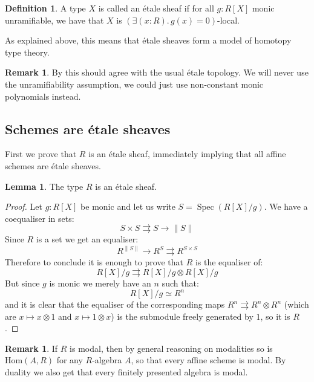 \documentclass[10pt,a4paper]{article}
\theoremstyle{definition}
\newtheorem{lemma}[theorem]{Lemma}
\newtheorem{definition}[theorem]{Definition}
\newtheorem{remark}[theorem]{Remark}
\DeclareMathOperator{\Spec}{Spec}
\newcommand{\propTrunc}[1]{\lVert #1 \rVert}
\begin{document}
\begin{definition}
A type $X$ is called an \'etale sheaf if for all $g:R[X]$ monic unramifiable, we have that $X$ is $(\exists(x:R).\, g(x)=0)$-local.
\end{definition}

As explained above, this means that étale sheaves form a model of homotopy type theory.


\begin{remark}
  By \cite{wraith79} this should agree with the usual \'etale topology.
  We will never use the unramifiability assumption, we could just use non-constant monic polynomials instead.
\end{remark}


\subsection{Schemes are \'etale sheaves}

First we prove that $R$ is an étale sheaf, immediately implying that all affine schemes are étale sheaves.

\begin{lemma}\label{etale-subcanonical}
The type $R$ is an \'etale sheaf.
\end{lemma}

\begin{proof}
Let $g:R[X]$ be monic and let us write $S=\Spec(R[X]/g)$. We have a coequaliser in sets:
\[S\times S\rightrightarrows S \to \propTrunc{S}\]
Since $R$ is a set we get an equaliser:
\[R^{\propTrunc{S}} \to R^S\rightrightarrows R^{S\times S}\]
Therefore to conclude it is enough to prove that $R$ is the equaliser of:
\[R[X]/g \rightrightarrows R[X]/g \otimes R[X]/g\]
But since $g$ is monic we merely have an $n$ such that:
\[R[X]/g \simeq R^n\]
and it is clear that the equaliser of the corresponding maps $R^n\rightrightarrows R^n\otimes R^n$ (which are $x\mapsto x\otimes 1$ and $x\mapsto 1\otimes x$) is the submodule freely generated by $1$, so it is $R$.
\end{proof}

\begin{remark}\label{R-modal-subcanonical}
If $R$ is modal, then by general reasoning on modalities so is $\mathrm{Hom}(A,R)$ for any $R$-algebra $A$, so that every affine scheme is modal. By duality we also get that every finitely presented algebra is modal.
\end{remark}
\end{document}
